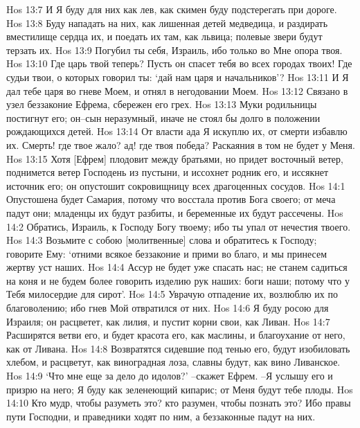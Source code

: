 Hos 13:7  И Я буду для них как лев, как скимен буду подстерегать при дороге.
Hos 13:8  Буду нападать на них, как лишенная детей медведица, и раздирать вместилище сердца их, и поедать их там, как львица; полевые звери будут терзать их.
Hos 13:9  Погубил ты себя, Израиль, ибо только во Мне опора твоя.
Hos 13:10  Где царь твой теперь? Пусть он спасет тебя во всех городах твоих! Где судьи твои, о которых говорил ты: `дай нам царя и начальников'?
Hos 13:11  И Я дал тебе царя во гневе Моем, и отнял в негодовании Моем.
Hos 13:12  Связано в узел беззаконие Ефрема, сбережен его грех.
Hos 13:13  Муки родильницы постигнут его; он--сын неразумный, иначе не стоял бы долго в положении рождающихся детей.
Hos 13:14  От власти ада Я искуплю их, от смерти избавлю их. Смерть! где твое жало? ад! где твоя победа? Раскаяния в том не будет у Меня.
Hos 13:15  Хотя [Ефрем] плодовит между братьями, но придет восточный ветер, поднимется ветер Господень из пустыни, и иссохнет родник его, и иссякнет источник его; он опустошит сокровищницу всех драгоценных сосудов.
Hos 14:1  Опустошена будет Самария, потому что восстала против Бога своего; от меча падут они; младенцы их будут разбиты, и беременные их будут рассечены.
Hos 14:2  Обратись, Израиль, к Господу Богу твоему; ибо ты упал от нечестия твоего.
Hos 14:3  Возьмите с собою [молитвенные] слова и обратитесь к Господу; говорите Ему: `отними всякое беззаконие и прими во благо, и мы принесем жертву уст наших.
Hos 14:4  Ассур не будет уже спасать нас; не станем садиться на коня и не будем более говорить изделию рук наших: боги наши; потому что у Тебя милосердие для сирот'.
Hos 14:5  Уврачую отпадение их, возлюблю их по благоволению; ибо гнев Мой отвратился от них.
Hos 14:6  Я буду росою для Израиля; он расцветет, как лилия, и пустит корни свои, как Ливан.
Hos 14:7  Расширятся ветви его, и будет красота его, как маслины, и благоухание от него, как от Ливана.
Hos 14:8  Возвратятся сидевшие под тенью его, будут изобиловать хлебом, и расцветут, как виноградная лоза, славны будут, как вино Ливанское.
Hos 14:9  `Что мне еще за дело до идолов?' --скажет Ефрем. --Я услышу его и призрю на него; Я буду как зеленеющий кипарис; от Меня будут тебе плоды.
Hos 14:10  Кто мудр, чтобы разуметь это? кто разумен, чтобы познать это? Ибо правы пути Господни, и праведники ходят по ним, а беззаконные падут на них.



